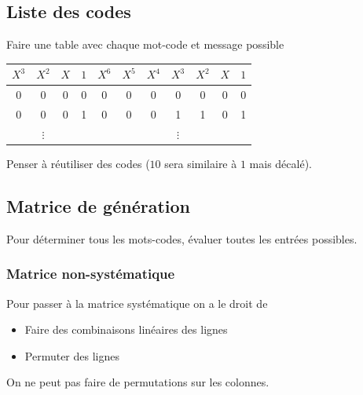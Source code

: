 \documentclass[resume.tex]{subfiles}
\begin{document}
\subsection{Liste des codes}
Faire une table avec chaque mot-code et message possible
\begin{center}
\begin{tabular}{cccc|ccccccc}
$X^3$ & $X^2$ & $X$ & $1$ & $X^6$ & $X^5$ & $X^4$ & $X^3$ & $X^2$ & $X$ & $1$\\\hline
0 & 0 & 0 & 0 & 0 & 0 & 0 & 0 & 0 & 0 & 0\\
0 & 0 & 0 & 1 & 0 & 0 & 0 & 1 & 1 & 0 & 1\\
& $\vdots$ & & & & & & $\vdots$
\end{tabular}
\end{center}
Penser à réutiliser des codes ($10$ sera similaire à $1$ mais décalé).

\subsection{Matrice de génération}
Pour déterminer tous les mots-codes, évaluer toutes les entrées possibles.
\subsubsection{Matrice non-systématique}
Pour passer à la matrice systématique on a le droit de
\begin{itemize}
\item Faire des combinaisons linéaires des lignes
\item Permuter des lignes
\end{itemize}
On ne peut pas faire de permutations sur les colonnes.
\end{document}
